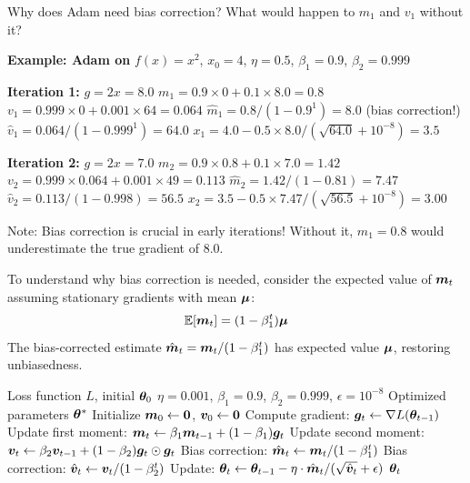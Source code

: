 \documentclass[../../main.tex]{subfiles}
\begin{document}
\begin{checkpoint}
Why does Adam need bias correction? What would happen to $m_1$ and $v_1$ without it?
\end{checkpoint}

\begin{algorithmtrace}
\textbf{Example: Adam on} $f(x) = x^2$, $x_0 = 4$, $\eta=0.5$, $\beta_1=0.9$, $\beta_2=0.999$

\textbf{Iteration 1:} $g = 2x = 8.0$
  $m_1 = 0.9 \times 0 + 0.1 \times 8.0 = 0.8$
  $v_1 = 0.999 \times 0 + 0.001 \times 64 = 0.064$
  $\hat{m}_1 = 0.8 / (1 - 0.9^1) = 8.0$ \quad (bias correction!)
  $\hat{v}_1 = 0.064 / (1 - 0.999^1) = 64.0$
  $x_1 = 4.0 - 0.5 \times 8.0 / (\sqrt{64.0} + 10^{-8}) = 3.5$

\textbf{Iteration 2:} $g = 2x = 7.0$
  $m_2 = 0.9 \times 0.8 + 0.1 \times 7.0 = 1.42$
  $v_2 = 0.999 \times 0.064 + 0.001 \times 49 = 0.113$
  $\hat{m}_2 = 1.42 / (1 - 0.81) = 7.47$
  $\hat{v}_2 = 0.113 / (1 - 0.998) = 56.5$
  $x_2 = 3.5 - 0.5 \times 7.47 / (\sqrt{56.5} + 10^{-8}) = 3.00$

Note: Bias correction is crucial in early iterations!
Without it, $m_1 = 0.8$ would underestimate the true gradient of 8.0.
\end{algorithmtrace}

To understand why bias correction is needed, consider the expected value of $\boldsymbol{m}_t$ assuming stationary gradients with mean $\boldsymbol{\mu}$:
\[
    \operatorname{\mathbb{E}}[\boldsymbol{m}_t] = (1 - \beta_1^t) \boldsymbol{\mu}
\]
The bias-corrected estimate $\hat{\boldsymbol{m}}_t = \boldsymbol{m}_t / (1 - \beta_1^t)$ has expected value $\boldsymbol{\mu}$, restoring unbiasedness.

\begin{algorithm}[htbp]
\caption{Adam Optimizer}
\label{alg:adam-ch12}
\begin{algorithmic}[1]
\Require Loss function $L$, initial $\boldsymbol{\theta}_0$
\Require $\eta = 0.001$, $\beta_1 = 0.9$, $\beta_2 = 0.999$, $\epsilon = 10^{-8}$
\Ensure Optimized parameters $\boldsymbol{\theta}^*$
\State Initialize $\boldsymbol{m}_0 \gets \mathbf{0}$, $\boldsymbol{v}_0 \gets \mathbf{0}$
    \State Compute gradient: $\boldsymbol{g}_t \gets \nabla L(\boldsymbol{\theta}_{t-1})$
    \State Update first moment: $\boldsymbol{m}_t \gets \beta_1 \boldsymbol{m}_{t-1} + (1-\beta_1) \boldsymbol{g}_t$
    \State Update second moment: $\boldsymbol{v}_t \gets \beta_2 \boldsymbol{v}_{t-1} + (1-\beta_2) \boldsymbol{g}_t \odot \boldsymbol{g}_t$
    \State Bias correction: $\hat{\boldsymbol{m}}_t \gets \boldsymbol{m}_t / (1 - \beta_1^t)$
    \State Bias correction: $\hat{\boldsymbol{v}}_t \gets \boldsymbol{v}_t / (1 - \beta_2^t)$
    \State Update: $\boldsymbol{\theta}_t \gets \boldsymbol{\theta}_{t-1} - \eta \cdot \hat{\boldsymbol{m}}_t / (\sqrt{\hat{\boldsymbol{v}}_t} + \epsilon)$
\EndFor
\State \Return $\boldsymbol{\theta}_t$
\end{algorithmic}
\end{algorithm}
\end{document}
